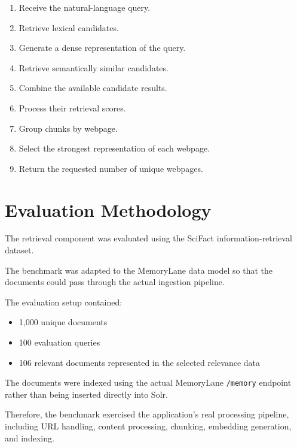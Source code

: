 \documentclass{tietreport}
\begin{document}
\begin{enumerate}

    \item Receive the natural-language query.

    \item Retrieve lexical candidates.

    \item Generate a dense representation of the query.

    \item Retrieve semantically similar candidates.

    \item Combine the available candidate results.

    \item Process their retrieval scores.

    \item Group chunks by webpage.

    \item Select the strongest representation of each webpage.

    \item Return the requested number of unique webpages.

\end{enumerate}

\section{Evaluation Methodology}

The retrieval component was evaluated using the SciFact
information-retrieval dataset.

The benchmark was adapted to the MemoryLane data model so that
the documents could pass through the actual ingestion pipeline.

The evaluation setup contained:

\begin{itemize}
    \item 1,000 unique documents
    \item 100 evaluation queries
    \item 106 relevant documents represented in the selected
    relevance data
\end{itemize}

The documents were indexed using the actual MemoryLane
\texttt{/memory} endpoint rather than being inserted directly
into Solr.

Therefore, the benchmark exercised the application's real
processing pipeline, including URL handling, content
processing, chunking, embedding generation, and indexing.
\end{document}
